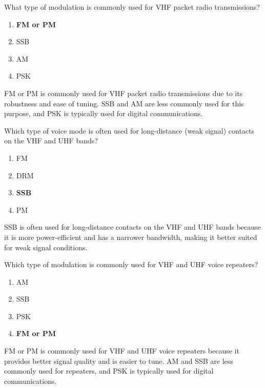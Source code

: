 
\begin{tcolorbox}[colback=gray!10!white,colframe=black!75!black,title={T8A02}]
    What type of modulation is commonly used for VHF packet radio transmissions?
    \begin{enumerate}[label=\Alph*),noitemsep]
        \item \textbf{FM or PM}
        \item SSB
        \item AM
        \item PSK
    \end{enumerate}
\end{tcolorbox}
FM or PM is commonly used for VHF packet radio transmissions due to its robustness and ease of tuning. SSB and AM are less commonly used for this purpose, and PSK is typically used for digital communications.


\begin{tcolorbox}[colback=gray!10!white,colframe=black!75!black,title={T8A03}]
    Which type of voice mode is often used for long-distance (weak signal) contacts on the VHF and UHF bands?
    \begin{enumerate}[label=\Alph*),noitemsep]
        \item FM
        \item DRM
        \item \textbf{SSB}
        \item PM
    \end{enumerate}
\end{tcolorbox}
SSB is often used for long-distance contacts on the VHF and UHF bands because it is more power-efficient and has a narrower bandwidth, making it better suited for weak signal conditions.


\begin{tcolorbox}[colback=gray!10!white,colframe=black!75!black,title={T8A04}]
    Which type of modulation is commonly used for VHF and UHF voice repeaters?
    \begin{enumerate}[label=\Alph*),noitemsep]
        \item AM
        \item SSB
        \item PSK
        \item \textbf{FM or PM}
    \end{enumerate}
\end{tcolorbox}
FM or PM is commonly used for VHF and UHF voice repeaters because it provides better signal quality and is easier to tune. AM and SSB are less commonly used for repeaters, and PSK is typically used for digital communications.

